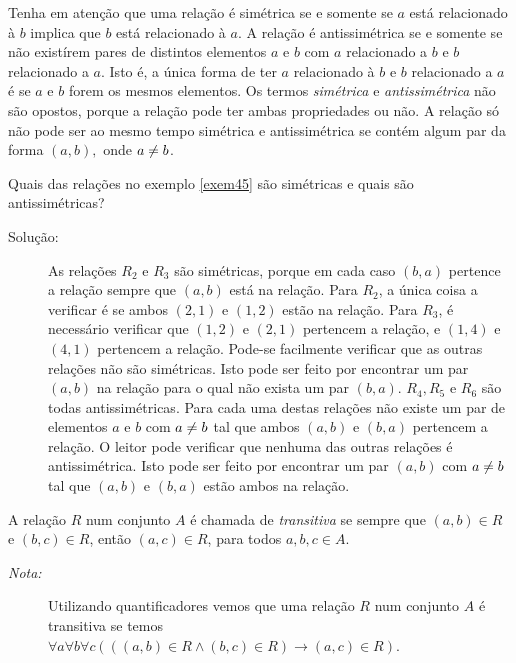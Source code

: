 Tenha em atenção que uma relação é simétrica se e somente se $a$ está
relacionado à $b$ implica que $b$ está relacionado à $a$. A relação é
antissimétrica se e somente se não existírem pares de distintos elementos $a$ e
$b$ com $a$ relacionado a $b$ e $b$ relacionado a $a$. Isto é, a única forma de
ter $a$ relacionado à $b$ e $b$ relacionado a $a$ é se $a$ e $b$ forem os mesmos
elementos. Os termos \emph{simétrica} e \emph{antissimétrica} não são opostos,
porque a relação pode ter ambas propriedades ou não. A relação só não pode ser
ao mesmo tempo simétrica e antissimétrica se contém algum par da forma $(a,b),$
onde $a \centernot{=} b$.

\label{exem47}
\begin{exmp}
Quais das relações no exemplo \ref{exem45} são simétricas e quais são
antissimétricas?

\begin{description}
\item[Solução:]As relações $R_2$ e $R_3$ são simétricas, porque em
cada caso $(b,a)$ pertence a relação sempre que $(a,b)$ está na relação. Para
$R_2$, a única coisa a verificar é se ambos $(2,1)$ e $(1,2)$ estão na relação.
Para $R_3$, é necessário verificar que $(1,2)$ e $(2,1)$ pertencem a relação, e
$(1,4)$ e $(4,1)$ pertencem a relação. Pode-se facilmente verificar que as
outras relações não são simétricas. Isto pode ser feito por encontrar um par
$(a,b)$ na relação para o qual não exista um par $(b,a)$. $R_4, R_5$ e $R_6$ são
todas antissimétricas. Para cada uma destas relações não existe um par de
elementos $a$ e $b$ com $a \centernot{=} b$ tal que ambos $(a,b)$ e $(b,a)$
pertencem a relação. O leitor pode verificar que nenhuma das outras relações é
antissimétrica. Isto pode ser feito por encontrar um par $(a,b)$ com $a
\centernot{=} b$ tal que $(a,b)$ e $(b,a)$ estão ambos na relação.
\end{description}
\end{exmp}

\label{def45}
\begin{defn}
A relação $R$ num conjunto $A$ é chamada de \emph{transitiva} se sempre que
$(a,b) \in R$ e $(b,c) \in R$, então $(a,c) \in R$, para todos $a, b, c \in
A$.

\begin{description}
\item[\emph{Nota:}]Utilizando quantificadores vemos que uma relação $R$ num
conjunto $A$ é transitiva se temos $\forall{a}\forall{b}\forall{c}(((a,b) \in R
\land (b,c) \in R) \to (a,c) \in R)$.
\end{description}
\end{defn}

